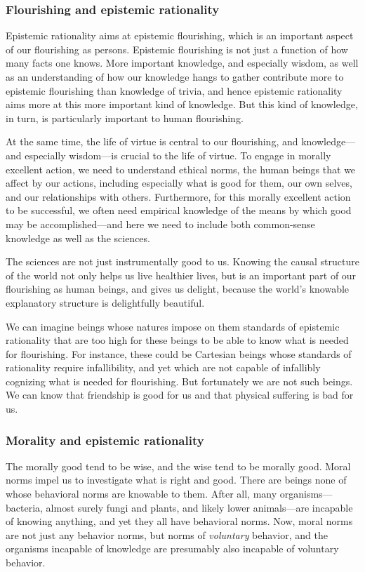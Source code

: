 \subsubsection{Flourishing and epistemic rationality}
Epistemic rationality aims at epistemic flourishing, which is an important aspect of our flourishing as persons.
Epistemic flourishing is not just a function of how many facts one knows. More important knowledge, and especially
wisdom, as well as an understanding of how our knowledge hangs to gather contribute more to epistemic flourishing 
than knowledge of trivia, and hence epistemic rationality aims more at this more important kind of knowledge. But 
this kind of knowledge, in turn, is particularly important to human flourishing.

At the same time, the life of virtue is central to our flourishing, and knowledge---and especially wisdom---is 
crucial to the life of virtue. To engage in morally excellent action, we need to understand ethical norms, the 
human beings that we affect by our actions, including especially what is good for them, our own selves, and our 
relationships with others. Furthermore, for this morally excellent action to be successful, we often need empirical
knowledge of the means by which good may be accomplished---and here we need to include both common-sense knowledge 
as well as the sciences.

The sciences are not just instrumentally good to us. Knowing the causal structure of the world not only helps us 
live healthier lives, but is an important part of our flourishing as human beings, and gives us delight, because
the world's knowable explanatory structure is delightfully beautiful.

We can imagine beings whose natures impose on them standards of epistemic rationality that are too high for these beings to 
be able to know what is needed for flourishing. For instance, these could be Cartesian beings whose standards of rationality 
require infallibility, and yet which are not capable of infallibly cognizing what is needed for flourishing. But fortunately 
we are not such beings. We can know that friendship is good for us and that physical suffering is bad for us. 

\subsubsection{Morality and epistemic rationality}
The morally good tend to be wise, and the wise tend to be morally good. Moral norms impel us to investigate what is 
right and good. There are beings none of whose behavioral norms are knowable to them. After all, many organisms---bacteria, almost surely fungi and plants, and likely lower animals---are incapable of knowing anything, and yet they all have behavioral norms.
Now, moral norms are not just any behavior norms, but norms of \textit{voluntary} behavior, and the organisms incapable
of knowledge are presumably also incapable of voluntary behavior. 

